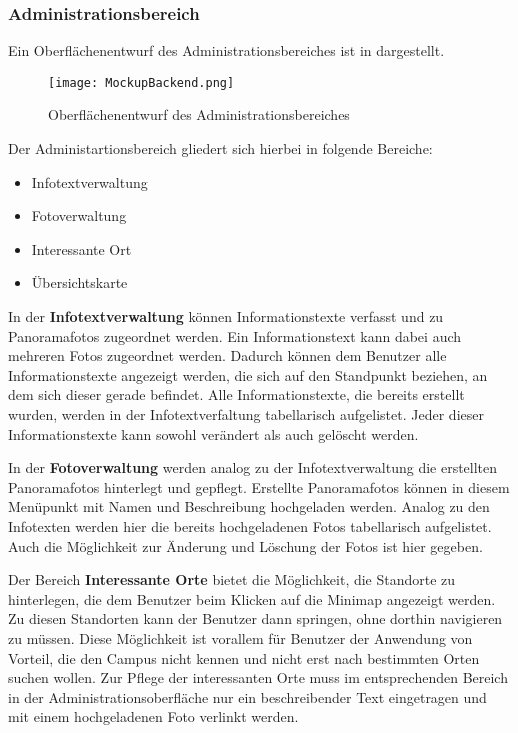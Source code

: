 \subsubsection{Administrationsbereich}
\label{sec:Administrationsbereich}

Ein Oberflächenentwurf des Administrationsbereiches ist in
 dargestellt.

\begin{figure}[htb]
\centering
\texttt{[image: MockupBackend.png]}
\caption[Oberflächenentwurf des
Administrationsbereiches]{Oberflächenentwurf des
Administrationsbereiches\protect\footnotemark}
\label{fig:MockupBackend}
\end{figure}

Der Administartionsbereich gliedert sich hierbei in folgende Bereiche:

\begin{itemize}
  \item Infotextverwaltung
  \item Fotoverwaltung
  \item Interessante Ort
  \item Übersichtskarte
\end{itemize}

In der \textbf{Infotextverwaltung} können Informationstexte verfasst und zu
Panoramafotos zugeordnet werden. Ein Informationstext kann dabei auch mehreren
Fotos zugeordnet werden. Dadurch können dem Benutzer alle Informationstexte
angezeigt werden, die sich auf den Standpunkt beziehen, an dem sich dieser
gerade befindet. Alle Informationstexte, die bereits erstellt wurden, werden in
der Infotextverfaltung tabellarisch aufgelistet. Jeder dieser Informationstexte
kann sowohl verändert als auch gelöscht werden.

In der \textbf{Fotoverwaltung} werden analog zu der Infotextverwaltung die
erstellten Panoramafotos hinterlegt und gepflegt. Erstellte Panoramafotos
können in diesem Menüpunkt mit Namen und Beschreibung hochgeladen werden.
Analog zu den Infotexten werden hier die bereits hochgeladenen Fotos
tabellarisch aufgelistet. Auch die Möglichkeit zur Änderung und Löschung der
Fotos ist hier gegeben.

Der Bereich \textbf{Interessante Orte} bietet die
Möglichkeit, die Standorte zu hinterlegen, die dem Benutzer beim Klicken
auf die Minimap angezeigt werden. Zu diesen Standorten kann der Benutzer
dann springen, ohne dorthin navigieren zu müssen. Diese Möglichkeit ist vorallem
für Benutzer der Anwendung von Vorteil, die den Campus nicht kennen und nicht
erst nach bestimmten Orten suchen wollen. Zur Pflege der interessanten Orte muss
im entsprechenden Bereich in der Administrationsoberfläche nur ein
beschreibender Text eingetragen und mit einem hochgeladenen Foto verlinkt werden.
 
